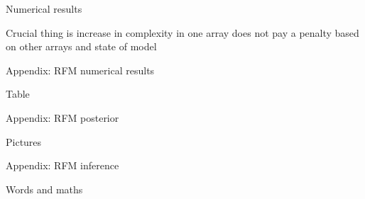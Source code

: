 \begin{frame}{Numerical results}
  \begin{block}{}
    Crucial thing is increase in complexity in one array does not pay a penalty based on other arrays and state of model
  \end{block}
\end{frame}

\begin{frame}{Appendix: RFM numerical results}
  \begin{block}{}
    Table
  \end{block}
\end{frame}

\begin{frame}{Appendix: RFM posterior}
  \begin{block}{}
    Pictures
  \end{block}
\end{frame}

\begin{frame}{Appendix: RFM inference}
  \begin{block}{}
    Words and maths
  \end{block}
\end{frame}




